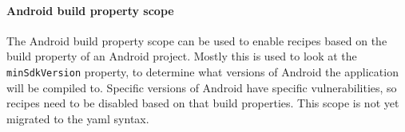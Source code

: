 \paragraph{Android build property scope} The {Android build property scope} can be used to enable recipes based on the build property of an Android project. Mostly this is used to look at the \texttt{minSdkVersion} property, to determine what versions of Android the application will be compiled to. Specific versions of Android have specific vulnerabilities, so recipes need to be disabled based on that build properties. This scope is not yet migrated to the \gls{yaml} syntax.